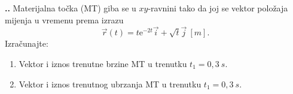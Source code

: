 
\noindent 
\textbf{
\thecjelina.\thezadatak.}
Materijalna točka (MT) giba se u $xy$-ravnini tako da joj se vektor položaja mijenja u
vremenu prema izrazu
$$
\vec{r}(t)=t\mathrm{e}^{-2t}\vec{i}+\sqrt{t}\vec{j}\ [m].
$$
Izračunajte: 
\begin{enumerate}[label=\alph*)]
 \item Vektor i iznos trenutne brzine MT u trenutku $t_1=0,3\ s$.
 \item  Vektor i iznos trenutnog ubrzanja MT u trenutku $t_1=0,3\ s$.

\end{enumerate}
